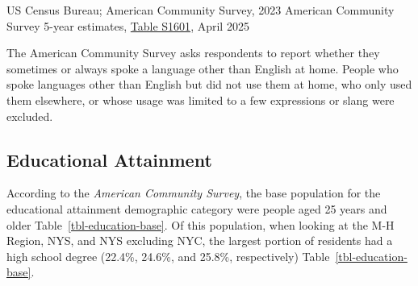 \documentclass[
  english,
  letterpaper,
]{report}
\begin{document}
\begin{tcolorbox}[enhanced jigsaw, breakable, leftrule=.75mm, title=\textcolor{quarto-callout-note-color}{\faInfo}\hspace{0.5em}{Source}, bottomrule=.15mm, opacityback=0, left=2mm, colback=white, bottomtitle=1mm, coltitle=black, colbacktitle=quarto-callout-note-color!10!white, colframe=quarto-callout-note-color-frame, opacitybacktitle=0.6, toptitle=1mm, titlerule=0mm, arc=.35mm, rightrule=.15mm, toprule=.15mm]

US Census Bureau; American Community Survey, 2023 American Community
Survey 5-year estimates,
\href{https://data.census.gov/table/ACSST5Y2023.S1601?q=s1601&g=050XX00US36105,36027,36071,36119,36087,36079,36111_160XX00US3651000_040XX00US36}{Table
S1601}, April 2025

\end{tcolorbox}

\begin{tcolorbox}[enhanced jigsaw, breakable, leftrule=.75mm, title=\textcolor{quarto-callout-note-color}{\faInfo}\hspace{0.5em}{Note}, bottomrule=.15mm, opacityback=0, left=2mm, colback=white, bottomtitle=1mm, coltitle=black, colbacktitle=quarto-callout-note-color!10!white, colframe=quarto-callout-note-color-frame, opacitybacktitle=0.6, toptitle=1mm, titlerule=0mm, arc=.35mm, rightrule=.15mm, toprule=.15mm]

The American Community Survey asks respondents to report whether they
sometimes or always spoke a language other than English at home. People
who spoke languages other than English but did not use them at home, who
only used them elsewhere, or whose usage was limited to a few
expressions or slang were excluded.

\end{tcolorbox}

\subsection{Educational Attainment}\label{educational-attainment}

According to the \emph{American Community Survey}, the base population
for the educational attainment demographic category were people aged 25
years and older Table~\ref{tbl-education-base}. Of this population, when
looking at the M-H Region, NYS, and NYS excluding NYC, the largest
portion of residents had a high school degree (22.4\%, 24.6\%, and
25.8\%, respectively) Table~\ref{tbl-education-base}.
\end{document}
